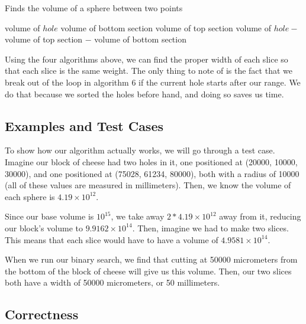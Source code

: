 \documentclass[12pt]{article}
\begin{document}
\begin{algorithm}[H]
\caption{Finds the volume of a sphere between two points}
\begin{algorithmic}
            \State \Return volume of $hole$
            \State \Return volume of bottom section
            \State \Return volume of top section
            \State \Return volume of $hole -$ volume of top section $-$ volume of bottom section
        \EndIf
    \EndProcedure
\end{algorithmic}
\end{algorithm}

Using the four algorithms above, we can find the proper width of each slice
so that each slice is the same weight. The only thing to note of is the
fact that we break out of the loop in algorithm 6 if the current hole
starts after our range. We do that because we sorted the holes before hand,
and doing so saves us time.

\subsection{Examples and Test Cases}

To show how our algorithm actually works, we will go through
a test case. Imagine our block of cheese had two holes in it,
one positioned at (20000, 10000, 30000), and one positioned at
(75028, 61234, 80000), both with a radius of 10000 (all of
these values are measured in millimeters). Then, we know
the volume of each sphere is $4.19 \times 10^{12}$.

Since our base volume is $10^{15}$, we take away $2 * 4.19 \times
10^{12}$ away from it, reducing our block's volume to $9.9162
\times 10^{14}$. Then, imagine we had to make two slices. This
means that each slice would have to have a volume of $4.9581
\times 10^{14}$.

When we run our binary search, we find that cutting at 50000
micrometers from the bottom of the block of cheese will give
us this volume. Then, our two slices both have a width of
50000 micrometers, or 50 millimeters.

\newpage

\subsection{Correctness}
\end{document}
